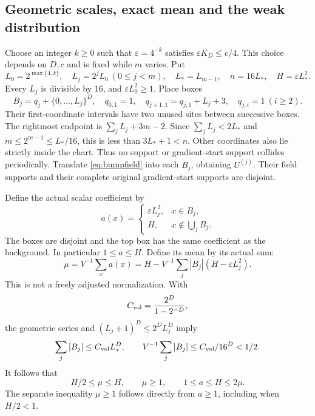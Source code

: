 \subsection{Geometric scales, exact mean and the weak distribution}
Choose an integer $k\ge0$ such that $\varepsilon=4^{-k}$ satisfies
$\varepsilon K_D\le c/4$. This choice depends on $D,c$ and is fixed
while $m$ varies. Put
\begin{equation}\label{eq:scales}
 L_0=2^{\max\{4,k\}},\quad L_j=2^jL_0\ (0\le j<m),\quad
 L_*=L_{m-1},\quad n=16L_*,\quad H=\varepsilon L_*^2.
\end{equation}
Every $L_j$ is divisible by $16$, and $\varepsilon L_0^2\ge1$.
Place boxes
\[
 B_j=q_j+\{0,\ldots,L_j\}^D,\quad
 q_{0,1}=1,\quad q_{j+1,1}=q_{j,1}+L_j+3,\quad
 q_{j,i}=1\ (i\ge2).
\]
Their first-coordinate intervals have two unused sites between successive
boxes. The rightmost endpoint is $\sum_jL_j+3m-2$.
Since $\sum_jL_j<2L_*$ and $m\le2^{m-1}\le L_*/16$,
this is less than $3L_*+1<n$. Other coordinates also lie strictly inside
the chart. Thus no support or gradient-start support collides periodically.
Translate \eqref{eq:bumpfield} into each $B_j$, obtaining $U^{(j)}$.
Their field supports and their complete original gradient-start supports
are disjoint.

Define the actual scalar coefficient by
\begin{equation}\label{eq:weakprofile}
 a(x)=\begin{cases}\varepsilon L_j^2,&x\in B_j,\\
 H,&x\notin\bigcup_jB_j.
 \end{cases}
\end{equation}
The boxes are disjoint and the top box has the same coefficient as the
background. In particular $1\le a\le H$. Define its mean by its actual sum:
\begin{equation}\label{eq:exactmean}
 \mu=V^{-1}\sum_xa(x)
    =H-V^{-1}\sum_j|B_j|(H-\varepsilon L_j^2).
\end{equation}
This is not a freely adjusted normalization. With
\[
 C_{\rm vol}=\frac{2^D}{1-2^{-D}},
\]
the geometric series and $(L_j+1)^D\le2^DL_j^D$ imply
\[
 \sum_j|B_j|\le C_{\rm vol}L_*^D,\qquad
 V^{-1}\sum_j|B_j|\le C_{\rm vol}/16^D<1/2.
\]
It follows that
\begin{equation}\label{eq:meanbounds}
 H/2\le\mu\le H,\qquad \mu\ge1,\qquad 1\le a\le H\le2\mu.
\end{equation}
The separate inequality $\mu\ge1$ follows directly from $a\ge1$,
including when $H/2<1$.

